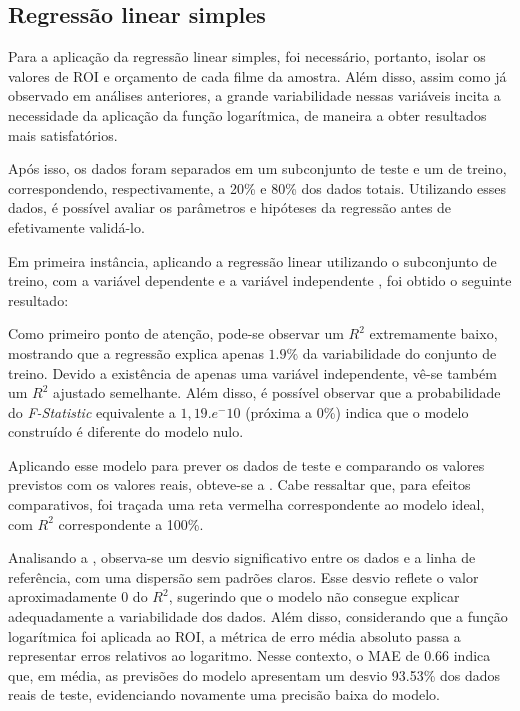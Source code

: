 \subsection{Regressão linear simples}
Para a aplicação da regressão linear simples, foi necessário, portanto, isolar os valores de \acrshort{ROI} e orçamento de cada filme da amostra. Além disso, assim como já observado em análises anteriores, a grande variabilidade nessas variáveis incita a necessidade da aplicação da função logarítmica, de maneira a obter resultados mais satisfatórios. 

Após isso, os dados foram separados em um subconjunto de teste e um de treino, correspondendo, respectivamente, a 20\% e 80\% dos dados totais. Utilizando esses dados, é possível avaliar os parâmetros e hipóteses da regressão antes de efetivamente validá-lo.

Em primeira instância, aplicando a regressão linear utilizando o subconjunto de treino, com a variável dependente  e a variável independente , foi obtido o seguinte resultado:

%

Como primeiro ponto de atenção, pode-se observar um $R^2$ extremamente baixo, mostrando que a regressão explica apenas $1.9\%$ da variabilidade do conjunto de treino. Devido a existência de apenas uma variável independente, vê-se também um $R^2$ ajustado semelhante. Além disso, é possível observar que a probabilidade do \textit{F-Statistic} equivalente a $1,19.e^-10$ (próxima a 0\%) indica que o modelo construído é diferente do modelo nulo.

Aplicando esse modelo para prever os dados de teste e comparando os valores previstos com os valores reais, obteve-se a . Cabe ressaltar que, para efeitos comparativos, foi traçada uma reta vermelha correspondente ao modelo ideal, com $R^2$ correspondente a 100\%.

%

Analisando a , observa-se um desvio significativo entre os dados e a linha de referência, com uma dispersão sem padrões claros. Esse desvio reflete o valor aproximadamente 0 do $R^2$, sugerindo que o modelo não consegue explicar adequadamente a variabilidade dos dados. Além disso, considerando que a função logarítmica foi aplicada ao \acrshort{ROI}, a métrica de erro média absoluto passa a representar erros relativos ao logaritmo. Nesse contexto, o \acrshort{MAE} de 0.66 indica que, em média, as previsões do modelo apresentam um desvio 93.53\% dos dados reais de teste, evidenciando novamente uma precisão baixa do modelo. 


